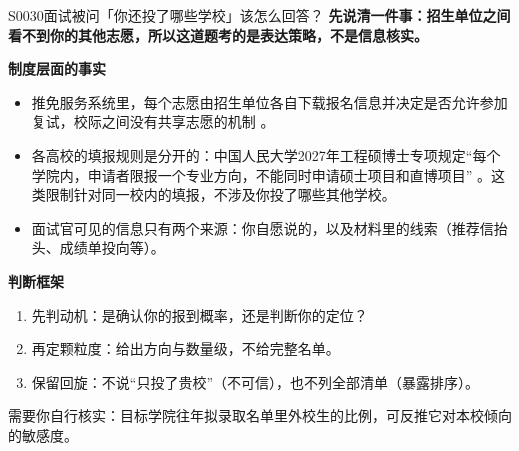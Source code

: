 \begin{qa}{S0030}{面试被问「你还投了哪些学校」该怎么回答？}
\textbf{先说清一件事：招生单位之间看不到你的其他志愿，所以这道题考的是表达策略，不是信息核实。}

\textbf{制度层面的事实}
\begin{itemize}
  \item 推免服务系统里，每个志愿由招生单位各自下载报名信息并决定是否允许参加复试，校际之间没有共享志愿的机制 。
  \item 各高校的填报规则是分开的：中国人民大学2027年工程硕博士专项规定“每个学院内，申请者限报一个专业方向，不能同时申请硕士项目和直博项目” 。这类限制针对同一校内的填报，不涉及你投了哪些其他学校。
  \item 面试官可见的信息只有两个来源：你自愿说的，以及材料里的线索（推荐信抬头、成绩单投向等）。
\end{itemize}

\textbf{判断框架}
\begin{enumerate}
  \item 先判动机：是确认你的报到概率，还是判断你的定位？
  \item 再定颗粒度：给出方向与数量级，不给完整名单。
  \item 保留回旋：不说“只投了贵校”（不可信），也不列全部清单（暴露排序）。
\end{enumerate}

需要你自行核实：目标学院往年拟录取名单里外校生的比例，可反推它对本校倾向的敏感度。
\end{qa}

